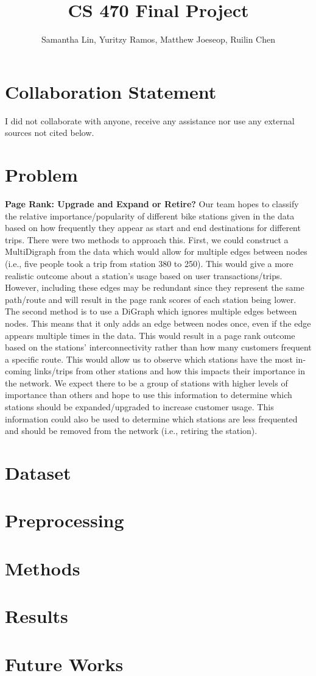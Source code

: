 \documentclass{article}
\title{CS 470 Final Project}
\author{Samantha Lin, Yuritzy Ramos, Matthew Joeseop, Ruilin Chen}
\begin{document}
\maketitle

\section{Collaboration Statement}
I did not collaborate with anyone, receive any assistance nor use any external sources not cited below.

\section{Problem}
\textbf{Page Rank: Upgrade and Expand or Retire?}
\newline 
Our team hopes to classify the relative importance/popularity of different bike stations given in the data based on how frequently they appear as start and end destinations for different trips. There were two methods to approach this. First, we could construct a MultiDigraph from the data which would allow for multiple edges between nodes (i.e., five people took a trip from station 380 to 250). This would give a more realistic outcome about a station's usage based on user transactions/trips. However, including these edges may be redundant since they represent the same path/route and will result in the page rank scores of each station being lower. The second method is to use a DiGraph which ignores multiple edges between nodes. This means that it only adds an edge between nodes once, even if the edge appears multiple times in the data. This would result in a page rank outcome based on the stations’  interconnectivity rather than how many customers frequent a specific route. This would allow us to observe which stations have the most in-coming links/trips from other stations and how this impacts their importance in the network. We expect there to be a group of stations with higher levels of importance than others and hope to use this information to determine which stations should be expanded/upgraded to increase customer usage. This information could also be used to determine which stations are less frequented and should be removed from the network (i.e., retiring the station).
\section{Dataset}

\section{Preprocessing}

\section{Methods}
 


\section{Results}

\section{Future Works}
\end{document}
